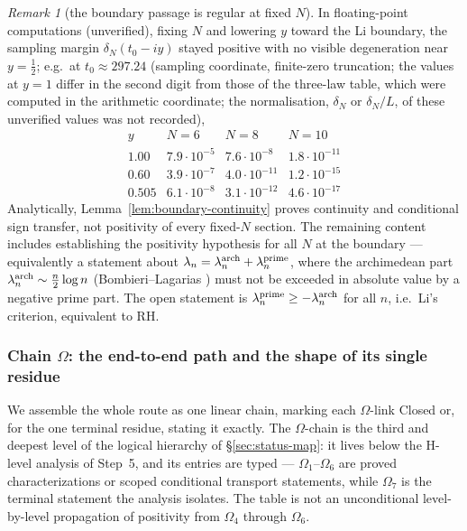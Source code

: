 \documentclass[11pt]{amsart}
\theoremstyle{definition}
\theoremstyle{remark}
\newtheorem{remark}[theorem]{Remark}
\theoremstyle{definition}
\newcommand{\half}{\tfrac{1}{2}}
\begin{document}
\begin{remark}[the boundary passage is regular at fixed $N$]
\label{rmk:boundary-regular}
In floating-point computations (unverified), fixing $N$ and lowering $y$ toward the Li boundary, the
sampling margin $\delta_N(t_0-iy)$ stayed positive with no visible degeneration near $y=\half$; e.g.\ at
$t_0\approx297.24$ (sampling coordinate, finite-zero truncation; the values at $y=1$ differ in the second digit from
those of the three-law table, which were computed in the arithmetic coordinate; the normalisation,
$\delta_N$ or $\delta_N/L$, of these unverified values was not recorded),
\[
   \begin{array}{c|ccc}
      y & N=6 & N=8 & N=10\\\hline
      1.00 & 7.9\!\cdot\!10^{-5} & 7.6\!\cdot\!10^{-8} & 1.8\!\cdot\!10^{-11}\\
      0.60 & 3.9\!\cdot\!10^{-7} & 4.0\!\cdot\!10^{-11} & 1.2\!\cdot\!10^{-15}\\
      0.505& 6.1\!\cdot\!10^{-8} & 3.1\!\cdot\!10^{-12} & 4.6\!\cdot\!10^{-17}
   \end{array}
\]
Analytically, Lemma~\ref{lem:boundary-continuity} proves continuity and conditional sign
transfer, not positivity of every fixed-$N$ section.  The remaining content includes establishing the
positivity hypothesis for all $N$ at the boundary --- equivalently a statement about
$\lambda_n=\lambda_n^{\rm arch}+\lambda_n^{\rm prime}$, where the archimedean part
$\lambda_n^{\rm arch}\sim\tfrac{n}{2}\log n$ (Bombieri--Lagarias \cite{BombieriLagarias1999}) must
not be exceeded in absolute value by a negative prime part.  The open statement is
$\lambda_n^{\rm prime}\ge-\lambda_n^{\rm arch}$ for all $n$, i.e.\ Li's criterion, equivalent to RH.
\end{remark}

\subsubsection*{Chain $\Omega$: the end-to-end path and the shape of its single residue}

We assemble the whole route as one linear chain, marking each $\Omega$-link Closed or, for the one
terminal residue, stating it exactly.  The
$\Omega$-chain is the third and deepest level of the logical hierarchy of \S\ref{sec:status-map}: it
lives below the H-level analysis of Step~5, and its entries are typed --- $\Omega_1$--$\Omega_6$ are
proved characterizations or scoped conditional transport statements, while $\Omega_7$ is the terminal
statement the analysis isolates.  The table is not an unconditional level-by-level propagation of
positivity from $\Omega_4$ through $\Omega_6$.
\end{document}
